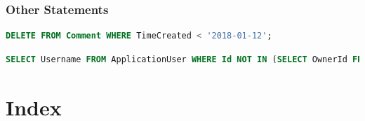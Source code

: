 \documentclass[letterpaper]{article}
\begin{document}
\subsubsection{Other Statements}

\begin{lstlisting}[language=SQL, caption=Delete All Comments Prior to A Given Date]
DELETE FROM Comment WHERE TimeCreated < '2018-01-12';
\end{lstlisting}
\begin{lstlisting}[language=SQL, caption=Delete Inactive Users]
SELECT Username FROM ApplicationUser WHERE Id NOT IN (SELECT OwnerId FROM Board UNION SELECT MemberId FROM BoardMember UNION SELECT OwnerId FROM  Comment UNION  SELECT AssigneeId FROM TaskAssignee);
\end{lstlisting}

\section{Index}
\lstlistoflistings
\end{document}
